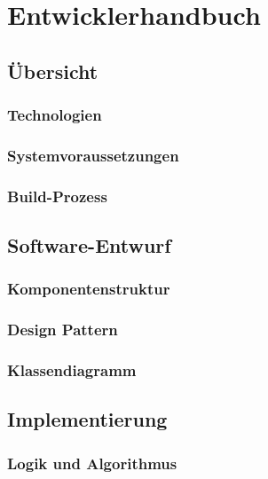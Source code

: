 \part{Entwicklerhandbuch}

\chapter{Übersicht}
\section{Technologien}

\section{Systemvoraussetzungen}

\section{Build-Prozess}


\chapter{Software-Entwurf}
\section{Komponentenstruktur}

\section{Design Pattern}

\section{Klassendiagramm}


\chapter{Implementierung}
\section{Logik und Algorithmus}

